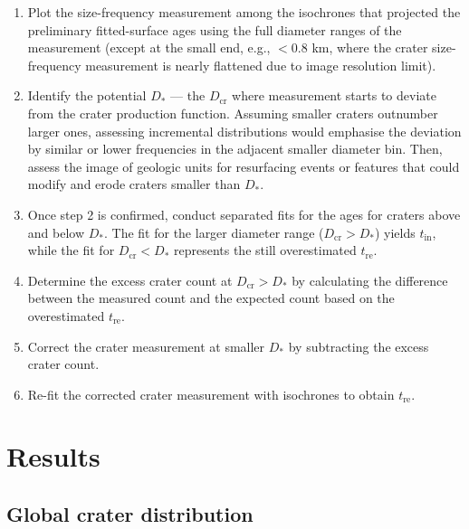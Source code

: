 \documentclass[preprint,12pt,3p,times,authoryear]{elsarticle}
\begin{document}
\begin{enumerate}
    \item Plot the size-frequency measurement among the isochrones that projected the preliminary fitted-surface ages using the full diameter ranges of the measurement (except at the small end, e.g., $< 0.8$ km, where the crater size-frequency measurement is nearly flattened due to image resolution limit).
    \item Identify the potential $D_*$ — the $D_{\text{cr}}$ where measurement starts to deviate from the crater production function. Assuming smaller craters outnumber larger ones, assessing incremental distributions would emphasise the deviation by similar or lower frequencies in the adjacent smaller diameter bin. Then, assess the image of geologic units for resurfacing events or features that could modify and erode craters smaller than $D_*$.
    \item Once step 2 is confirmed, conduct separated fits for the ages for craters above and below $D_*$. The fit for the larger diameter range ($D_{\text{cr}} > D_*$) yields $t_{\text{in}}$, while the fit for $D_{\text{cr}} < D_*$ represents the still overestimated $t_{\text{re}}$.
    \item Determine the excess crater count at $D_{\text{cr}} > D_*$ by calculating the difference between the measured count and the expected count based on the overestimated $t_{\text{re}}$.
    \item Correct the crater measurement at smaller $D_*$ by subtracting the excess crater count.
    \item Re-fit the corrected crater measurement with isochrones to obtain $t_{\text{re}}$.\\
\end{enumerate}



\section{Results}

\subsection{Global crater distribution}
\label{subsec:crater_dist}
\end{document}

